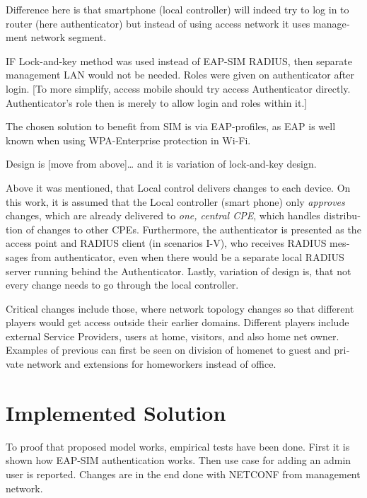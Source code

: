 \documentclass[12pt,a4paper,english]{tutthesis}
\begin{document}
\begin{otherlanguage}{english}
Difference here is that smartphone (local controller) will indeed try
to log in to router (here authenticator) but instead of using access network it uses 
management  network segment.


IF Lock-and-key method was used instead of EAP-SIM RADIUS, then
separate management LAN would not be needed. Roles were given on
authenticator after login.  [To more simplify, access mobile should
try access Authenticator directly. Authenticator's role then is merely
to allow login and roles within it.]



The chosen solution to benefit from SIM is via EAP-profiles, as EAP
is well known when using WPA-Enterprise protection in Wi-Fi.

Design is [move from above]\ldots{}
and it is variation of lock-and-key design.

Above it was mentioned, that Local control delivers changes to each
device. On this work, it is assumed that the Local controller (smart
phone) only \emph{approves} changes, which are already delivered to \emph{one,
central CPE}, which handles distribution of changes to other CPEs.
Furthermore, the authenticator is presented as the access point and
RADIUS client (in scenarios I-V), who receives RADIUS messages from
authenticator, even when there would be a separate local RADIUS server
running behind the Authenticator. 
Lastly, variation of design is, that not every change needs to go
 through  the local controller.




Critical changes include those, where network topology changes so
that different players would get access outside their earlier domains.
Different players include external Service Providers, users at home,
visitors, and also home net owner. Examples of previous can first be
seen on division of homenet to guest and private network and
extensions for homeworkers instead of office.







\chapter{Implemented Solution}
\label{sec-5}


To proof that proposed model works, empirical tests have been done.
First it is shown how EAP-SIM authentication works. Then use case for
adding an admin user is reported. Changes are in the end done with
NETCONF from management network.


\end{otherlanguage}
\end{document}
